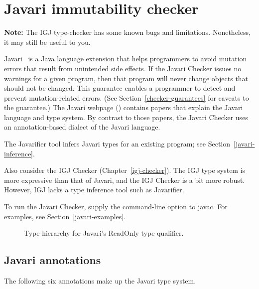 \htmlhr
\chapter{Javari immutability checker\label{javari-checker}}

\textbf{Note:} The IGJ type-checker has some known bugs and limitations.
Nonetheless, it may still be useful to you.

Javari~\cite{TschantzE2005,QuinonezTE2008} is a Java language extension that helps programmers to avoid mutation
errors that result from unintended side effects.
If the Javari Checker issues no warnings for a given program, then that
program will never change objects that should not be changed.  This
guarantee enables a programmer to detect and prevent mutation-related
errors.  (See Section~\ref{checker-guarantees} for caveats to the guarantee.)
The Javari webpage () contains
papers that explain the Javari language and type system.
By contrast to those papers, the Javari Checker uses an annotation-based
dialect of the Javari language.

The Javarifier tool infers Javari types for an existing program; see
Section~\ref{javari-inference}.

Also consider the IGJ Checker (Chapter~\ref{igj-checker}).  The IGJ type
system is more expressive than that of Javari, and the IGJ Checker is a bit
more robust.  However, IGJ lacks a type inference tool such as Javarifier.

To run the Javari Checker, supply the  command-line option to javac.  For
examples, see Section~\ref{javari-examples}.



\begin{figure}
\caption{Type hierarchy for Javari's ReadOnly type qualifier.}
\label{fig:javari-hierarchy}
\end{figure}


\section{Javari annotations\label{javary-annotations}}

The following six annotations make up the Javari type system.

